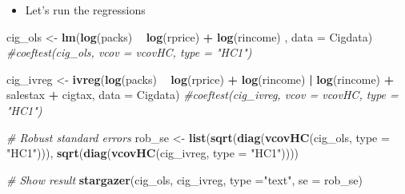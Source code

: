 \documentclass[]{book}
\newenvironment{Shaded}{\begin{snugshade}}{\end{snugshade}}
\newcommand{\KeywordTok}[1]{\textcolor[rgb]{0.13,0.29,0.53}{\textbf{#1}}}
\newcommand{\DataTypeTok}[1]{\textcolor[rgb]{0.13,0.29,0.53}{#1}}
\newcommand{\StringTok}[1]{\textcolor[rgb]{0.31,0.60,0.02}{#1}}
\newcommand{\CommentTok}[1]{\textcolor[rgb]{0.56,0.35,0.01}{\textit{#1}}}
\newcommand{\OperatorTok}[1]{\textcolor[rgb]{0.81,0.36,0.00}{\textbf{#1}}}
\newcommand{\NormalTok}[1]{#1}
\providecommand{\tightlist}{%
  \setlength{\itemsep}{0pt}\setlength{\parskip}{0pt}}
\begin{document}
\begin{itemize}
\tightlist
\item
  Let's run the regressions
\end{itemize}

\begin{Shaded}
\begin{Highlighting}[]
\NormalTok{cig_ols <-}\StringTok{ }\KeywordTok{lm}\NormalTok{(}\KeywordTok{log}\NormalTok{(packs) }\OperatorTok{~}\StringTok{ }\KeywordTok{log}\NormalTok{(rprice) }\OperatorTok{+}\StringTok{ }\KeywordTok{log}\NormalTok{(rincome) ,  }\DataTypeTok{data =}\NormalTok{ Cigdata)}
\CommentTok{#coeftest(cig_ols, vcov = vcovHC, type = "HC1")}


\NormalTok{cig_ivreg <-}\StringTok{ }\KeywordTok{ivreg}\NormalTok{(}\KeywordTok{log}\NormalTok{(packs) }\OperatorTok{~}\StringTok{ }\KeywordTok{log}\NormalTok{(rprice) }\OperatorTok{+}\StringTok{ }\KeywordTok{log}\NormalTok{(rincome)  }\OperatorTok{|}\StringTok{ }
\StringTok{                    }\KeywordTok{log}\NormalTok{(rincome) }\OperatorTok{+}\StringTok{  }\NormalTok{salestax }\OperatorTok{+}\StringTok{  }\NormalTok{cigtax, }\DataTypeTok{data =}\NormalTok{ Cigdata)}
\CommentTok{#coeftest(cig_ivreg, vcov = vcovHC, type = "HC1")}

\CommentTok{# Robust standard errors }
\NormalTok{rob_se <-}\StringTok{ }\KeywordTok{list}\NormalTok{(}\KeywordTok{sqrt}\NormalTok{(}\KeywordTok{diag}\NormalTok{(}\KeywordTok{vcovHC}\NormalTok{(cig_ols, }\DataTypeTok{type =} \StringTok{"HC1"}\NormalTok{))),}
               \KeywordTok{sqrt}\NormalTok{(}\KeywordTok{diag}\NormalTok{(}\KeywordTok{vcovHC}\NormalTok{(cig_ivreg, }\DataTypeTok{type =} \StringTok{"HC1"}\NormalTok{))))}

\CommentTok{# Show result}
\KeywordTok{stargazer}\NormalTok{(cig_ols, cig_ivreg, }\DataTypeTok{type =}\StringTok{"text"}\NormalTok{, }\DataTypeTok{se =}\NormalTok{ rob_se)}
\end{Highlighting}
\end{Shaded}
\end{document}
